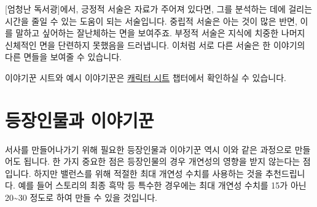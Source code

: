 \documentclass{report}
\begin{document}
	[엄청난 독서광]에서, 긍정적 서술은 자료가 주어져 있다면, 그를 분석하는 데에 걸리는 시간을 줄일 수 있는 도움이 되는 서술입니다. 중립적 서술은 아는 것이 많은 반면, 이를 말하고 싶어하는 잘난체하는 면을 보여주죠. 부정적 서술은 지식에 치중한 나머지 신체적인 면을 단련하지 못했음을 드러냅니다. 이처럼 서로 다른 서술은 한 이야기의 다른 면들을 보여줄 수 있습니다.
	
	\bigskip
	
	이야기꾼 시트와 예시 이야기꾼은 \hyperlink{lite-sheets}{캐릭터 시트} 챕터에서 확인하실 수 있습니다.
	
	\section*{등장인물과 이야기꾼}
	서사를 만들어나가기 위해 필요한 등장인물과 이야기꾼 역시 이와 같은 과정으로 만들어도 됩니다. 한 가지 중요한 점은 등장인물의 경우 개연성의 영향을 받지 않는다는 점입니다. 하지만 밸런스를 위해 적절한 최대 개연성 수치를 사용하는 것을 추천드립니다. 예를 들어 스토리의 최종 흑막 등 특수한 경우에는 최대 개연성 수치를 15가 아닌 20\textasciitilde30 정도로 하여 만들 수 있을 것입니다.
\end{document}
